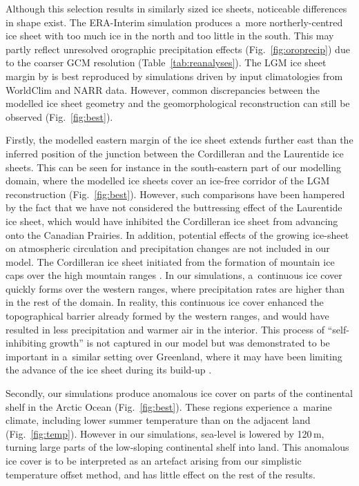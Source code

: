 \documentclass[tc, ms]{copernicus}
\begin{document}
Although this selection results in similarly sized ice sheets, noticeable differences in shape exist. The ERA-Interim simulation produces a~more northerly-centred ice sheet with too much ice in the north and too little in the south. This may partly reflect unresolved orographic precipitation effects (Fig.~\ref{fig:oroprecip}) due to the coarser GCM resolution (Table~\ref{tab:reanalyses}). The LGM ice sheet margin by \citet{dyke-2004} is best reproduced by simulations driven by input climatologies from WorldClim and NARR data. However, common discrepancies between the modelled ice sheet geometry and the geomorphological reconstruction can still be observed (Fig.~\ref{fig:best}).

Firstly, the modelled eastern margin of the ice sheet extends further east than the inferred position of the junction between the Cordilleran and the Laurentide ice sheets. This can be seen for instance in the south-eastern part of our modelling domain, where the modelled ice sheets cover an ice-free corridor of the LGM reconstruction (Fig.~\ref{fig:best}). However, such comparisons have been hampered by the fact that we have not considered the buttressing effect of the Laurentide ice sheet, which would have inhibited the Cordilleran ice sheet from advancing onto the Canadian Prairies. In addition, potential effects of the growing ice-sheet on atmospheric circulation and precipitation changes are not included in our model. The Cordilleran ice sheet initiated from the formation of mountain ice caps over the high mountain ranges \citep{clague-1989}. In our simulations, a~continuous ice cover quickly forms over the western ranges, where precipitation rates are higher than in the rest of the domain. In reality, this continuous ice cover enhanced the topographical barrier already formed by the western ranges, and would have resulted in less precipitation and warmer air in the interior. This process of ``self-inhibiting growth'' is not captured in our model but was demonstrated to be important in a~similar setting over Greenland, where it may have been limiting the advance of the ice sheet during its build-up \citep{langen-etal-2012}.

Secondly, our simulations produce anomalous ice cover on parts of the continental shelf in the Arctic Ocean (Fig.~\ref{fig:best}). These regions experience a~marine climate, including lower summer temperature than on the adjacent land (Fig.~\ref{fig:temp}). However in our simulations, sea-level is lowered by 120\,\unit{m}, turning large parts of the low-sloping continental shelf into land. This anomalous ice cover is to be interpreted as an artefact arising from our simplistic temperature offset method, and has little effect on the rest of the results.
\end{document}

